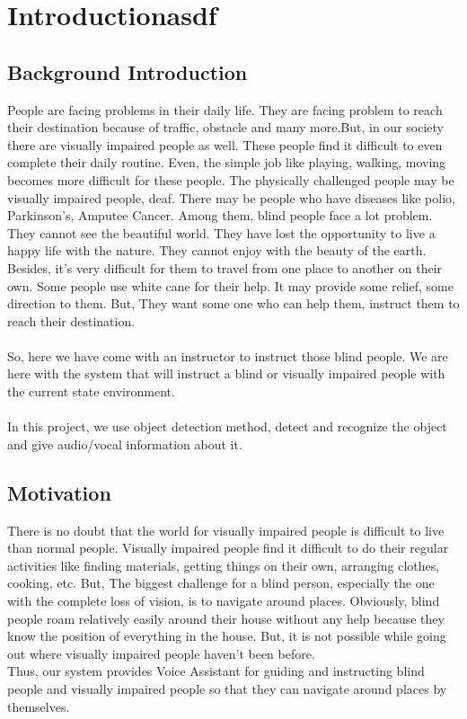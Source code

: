      \chapter{Introductionasdf}
        \section{Background Introduction}
            People are facing problems in their daily life. They are facing problem to reach their destination because of traffic, obstacle and many more.But, in our society there are visually impaired people as well. These people find it difficult to even complete their daily routine. Even, the simple job like playing, walking, moving becomes more difficult for these people. The physically challenged people may be visually impaired people, deaf. There may be people who have diseases like polio, Parkinson's, Amputee Cancer. Among them, blind people face a lot problem. They cannot see the beautiful world. They have lost the opportunity to live a happy life with the nature. They cannot enjoy with the beauty of the earth. Besides, it's very difficult for them to travel from one place to another on their own. Some people use white cane for their help. It may provide some relief, some direction to them. But, They want some one who can help them, instruct them to reach their destination. \\
            \\
            So, here we have come with an instructor to instruct those blind people. We are here with the system that will instruct a blind or visually impaired people with the current state environment. \\
            \\
            In this project, we use object detection method, detect and recognize the object and give audio/vocal information about it. 
        \pagebreak
        \section{Motivation}
            There is no doubt that the world for visually impaired people is difficult to live than normal people. Visually impaired people find it difficult to do their regular activities like finding materials, getting things on their own, arranging clothes, cooking, etc. But, The biggest challenge for a blind person, especially the one with the complete loss of vision, is to navigate around places. Obviously, blind people roam relatively easily around their house without any help because they know the position of everything in the house. But, it is not possible while going out where visually impaired people haven’t been before. \\
            Thus, our system provides Voice Assistant for guiding and instructing blind people and visually impaired people so that they can navigate around places by themselves. 
            
